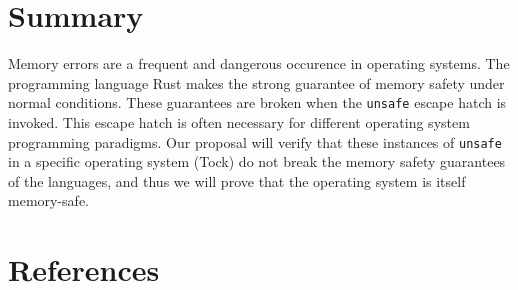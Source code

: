 \documentclass[12pt]{article}
\begin{document}
\section{Summary}
Memory errors are a frequent and dangerous occurence in operating systems. The programming language Rust makes the strong guarantee of memory safety under normal conditions. These guarantees are broken when the \texttt{unsafe} escape hatch is invoked. This escape hatch is often necessary for different operating system programming paradigms. Our proposal will verify that these instances of \texttt{unsafe} in a specific operating system (Tock) do not break the memory safety guarantees of the languages, and thus we will prove that the operating system is itself memory-safe.

\newpage
\section{References}


\end{document}
